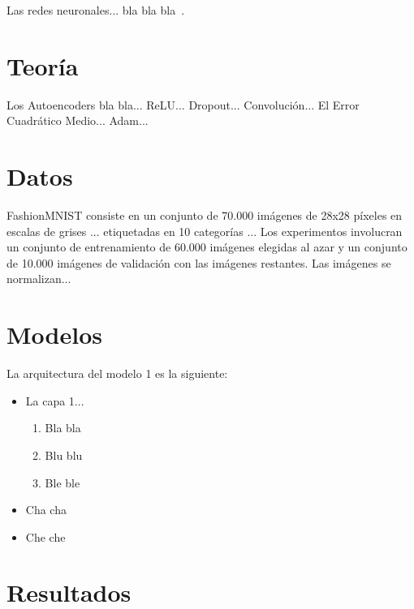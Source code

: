 \documentclass[aps,prl,preprint,groupedaddress]{revtex4-2}
\begin{document}
Las redes neuronales... bla bla bla~\cite{hertz1999introduction}.

\section{Teoría}

Los Autoencoders bla bla...
ReLU...
Dropout...
Convolución...
El Error Cuadrático Medio...
Adam...

\section{Datos}

FashionMNIST consiste en un conjunto de 70.000 imágenes de 28x28 píxeles en escalas de grises ... etiquetadas en 10 categorías ...
Los experimentos involucran un conjunto de entrenamiento de 60.000 imágenes elegidas al azar y un conjunto de 10.000 imágenes de validación con las imágenes restantes.
Las imágenes se normalizan...

\section{Modelos}

La arquitectura del modelo 1 es la siguiente:
\begin{itemize}
    \item La capa 1...
    \begin{enumerate}
        \item Bla bla
        \item Blu blu
        \item Ble ble
    \end{enumerate}
    \item Cha cha
    \item Che che
\end{itemize}

\section{Resultados}
\end{document}
